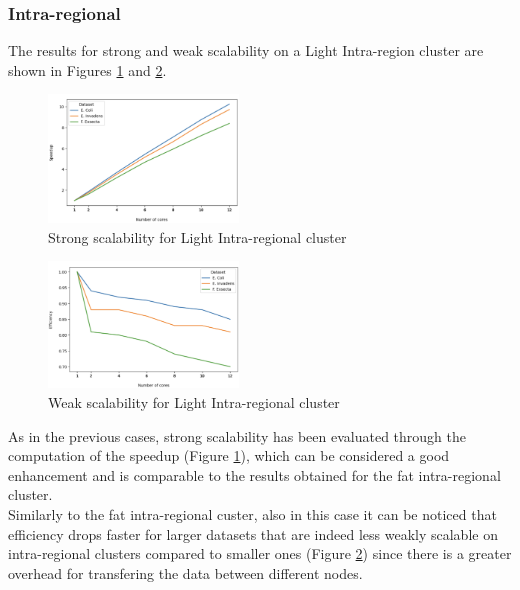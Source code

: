 \documentclass[final,5p,times,twocolumn,authoryear]{elsarticle}
\begin{document}
\subsubsection{Intra-regional}
The results for strong and weak scalability on a Light Intra-region cluster are shown in Figures \ref{fig:light-intra-strong} and \ref{fig:light-intra-weak}. \\
\begin{figure}[H]
    \centering
    \includegraphics[width=0.45\textwidth]{images/light_intra_strong.png}
    \caption{Strong scalability for Light Intra-regional cluster }
    \label{fig:light-intra-strong}
\end{figure}
\begin{figure}[H]
    \centering
    \includegraphics[width=0.45\textwidth]{images/light_intra_weak.png}
    \caption{Weak scalability for Light Intra-regional cluster }
    \label{fig:light-intra-weak}
\end{figure}
As in the previous cases, strong scalability has been evaluated through the computation of the speedup (Figure \ref{fig:light-intra-strong}), which can be considered a good enhancement and is comparable to the results obtained for the fat intra-regional cluster. \\
Similarly to the fat intra-regional custer, also in this case it can be noticed that efficiency drops faster for larger datasets that are indeed less weakly scalable on intra-regional clusters compared to smaller ones (Figure \ref{fig:light-intra-weak}) since there is a greater overhead for transfering the data between different nodes.
\end{document}
